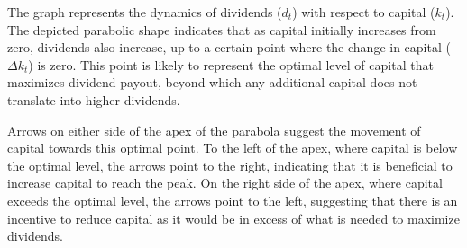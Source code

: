 \documentclass[12pt]{article}
\begin{document}
The graph represents the dynamics of dividends (\(d_t\)) with respect to capital (\(k_t\)). The depicted parabolic shape
indicates that as capital initially increases from zero, dividends also increase, up to a certain point where the change
in capital (\(\Delta k_t\)) is zero. This point is likely to represent the optimal level of capital that maximizes
dividend payout, beyond which any additional capital does not translate into higher dividends. 

Arrows on either side of the apex of the parabola suggest the movement of capital towards this optimal point. To the
left of the apex, where capital is below the optimal level, the arrows point to the right, indicating that it is
beneficial to increase capital to reach the peak. On the right side of the apex, where capital exceeds the optimal
level, the arrows point to the left, suggesting that there is an incentive to reduce capital as it would be in excess of
what is needed to maximize dividends. 
\end{document}
